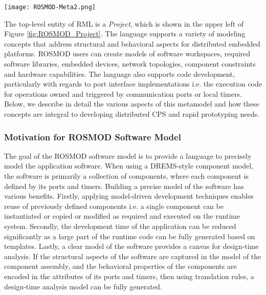 \begin{figure*}[ht]
	\centering
	\texttt{[image: ROSMOD-Meta2.png]}
	\caption{ROSMOD Metamodel.  Containment is specified from \emph{src} to \emph{dst} where the source has a containment attribute \emph{quantity}, meaning that \emph{quantity} objects of type \emph{src} can be contained in an object of type \emph{dst}. Pointers are specified as a one to one mapping from source to destination, using the name of the pointer. Sets allow for pointer containment. All objects contain a \emph{name} attribute of type \emph{string}, not shown for clarity.  Note: the metamodel is used to create the ROSMOD Modeling Language, but users do not see or interact with it; it is used to enforce proper model creation semantics.}
	\label{fig:ROSMOD_Project}	
\end{figure*}
\FloatBarrier

The top-level entity of RML is a \emph{Project}, which is shown in the upper left of Figure \ref{fig:ROSMOD_Project}.  The language supports a variety of modeling concepts that address structural and behavioral aspects for distributed embedded platforms. ROSMOD users can create models of software workspaces, required software libraries, embedded devices, network topologies, component constraints and hardware capabilities. The language also supports code development, particularly with regards to port interface implementations i.e. the execution code for operations owned and triggered by communication
ports or local timers. Below, we describe in detail the various aspects of this metamodel and how these concepts are integral to developing distributed CPS and rapid prototyping needs.

\subsubsection{Motivation for ROSMOD Software Model}

The goal of the ROSMOD software model is to provide a language to precisely model the application software. When using a DREMS-style component model, the software is primarily a collection of components, where each component is defined by its ports and timers. Building a precise model of the software has various benefits. Firstly, applying model-driven development techniques enables reuse of previously defined components i.e. a single component can be instantiated or copied or modified as required and executed on the runtime system. Secondly, the development time of the application can be reduced significantly as a large part of the runtime code can be fully generated based on templates. Lastly, a clear model of the software provides a canvas for design-time analysis. If the structural aspects of the software are captured in the model of the component assembly, and the behavioral properties of the components are encoded in the attributes of its ports and timers, then using translation rules, a design-time analysis model can be fully generated. 

